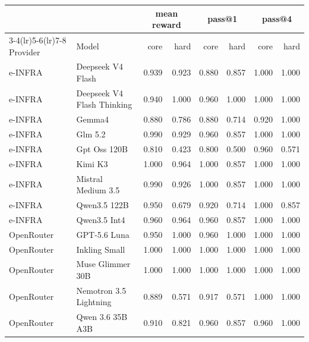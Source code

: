 \begin{tabular}{llrrrrrr}
\toprule
& & \multicolumn{2}{c}{mean reward} & \multicolumn{2}{c}{pass@1} & \multicolumn{2}{c}{pass@4} \\
\cmidrule(lr){3-4}\cmidrule(lr){5-6}\cmidrule(lr){7-8}
Provider & Model & core & hard & core & hard & core & hard \\
\midrule
e-INFRA & Deepseek V4 Flash & 0.939 & 0.923 & 0.880 & 0.857 & 1.000 & 1.000 \\
e-INFRA & Deepseek V4 Flash Thinking & 0.940 & 1.000 & 0.960 & 1.000 & 1.000 & 1.000 \\
e-INFRA & Gemma4 & 0.880 & 0.786 & 0.880 & 0.714 & 0.920 & 1.000 \\
e-INFRA & Glm 5.2 & 0.990 & 0.929 & 0.960 & 0.857 & 1.000 & 1.000 \\
e-INFRA & Gpt Oss 120B & 0.810 & 0.423 & 0.800 & 0.500 & 0.960 & 0.571 \\
e-INFRA & Kimi K3 & 1.000 & 0.964 & 1.000 & 0.857 & 1.000 & 1.000 \\
e-INFRA & Mistral Medium 3.5 & 0.990 & 0.926 & 1.000 & 0.857 & 1.000 & 1.000 \\
e-INFRA & Qwen3.5 122B & 0.950 & 0.679 & 0.920 & 0.714 & 1.000 & 0.857 \\
e-INFRA & Qwen3.5 Int4 & 0.960 & 0.964 & 0.960 & 0.857 & 1.000 & 1.000 \\
OpenRouter & GPT-5.6 Luna & 0.950 & 1.000 & 0.960 & 1.000 & 1.000 & 1.000 \\
OpenRouter & Inkling Small & 1.000 & 1.000 & 1.000 & 1.000 & 1.000 & 1.000 \\
OpenRouter & Muse Glimmer 30B & 1.000 & 1.000 & 1.000 & 1.000 & 1.000 & 1.000 \\
OpenRouter & Nemotron 3.5 Lightning & 0.889 & 0.571 & 0.917 & 0.571 & 1.000 & 1.000 \\
OpenRouter & Qwen 3.6 35B A3B & 0.910 & 0.821 & 0.960 & 0.857 & 0.960 & 1.000 \\
\bottomrule
\end{tabular}
